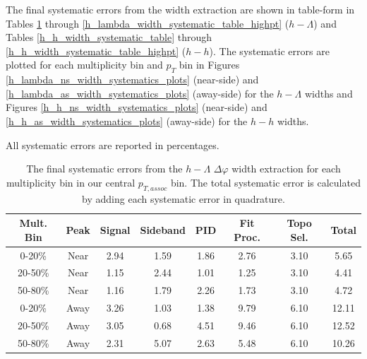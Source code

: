 \documentclass[ALICE,manyauthors]{ALICE_analysis_notes}
\begin{document}
The final systematic errors from the width extraction are shown in table-form in Tables \ref{h_lambda_width_systematic_table} through \ref{h_lambda_width_systematic_table_highpt} ($h-\Lambda$) and Tables \ref{h_h_width_systematic_table} through \ref{h_h_width_systematic_table_highpt} ($h-h$). The systematic errors are plotted for each multiplicity bin and $p_{T}$ bin in Figures \ref{h_lambda_ns_width_systematics_plots} (near-side) and \ref{h_lambda_as_width_systematics_plots} (away-side) for the $h-\Lambda$ widths and Figures \ref{h_h_ns_width_systematics_plots} (near-side) and \ref{h_h_as_width_systematics_plots} (away-side) for the $h-h$ widths.

All systematic errors are reported in percentages. 

\begin{table}[ht]
\centering
\begin{tabular}{|c|c||c|c|c|c|c||c|}
\hline
Mult. Bin & Peak & Signal & Sideband & PID & Fit Proc. & Topo Sel. &  Total \\
\hline

0-20\% & Near & 2.94 & 1.59 & 1.86 & 2.76 & 3.10 & 5.65 \\
20-50\% & Near & 1.15 & 2.44 & 1.01 & 1.25 & 3.10 & 4.41 \\
50-80\% & Near & 1.16 & 1.79 & 2.26 & 1.73 & 3.10 & 4.72 \\
0-20\% & Away & 3.26 & 1.03 & 1.38 & 9.79 & 6.10 & 12.11 \\
20-50\% & Away & 3.05 & 0.68 & 4.51 & 9.46 & 6.10 & 12.52 \\
50-80\% & Away & 2.31 & 5.07 & 2.63 & 5.48 & 6.10 & 10.26 \\

\hline
\end{tabular}
\caption{The final systematic errors from the $h-\Lambda$ $\Delta\varphi$ width extraction  for each multiplicity bin in our central $p_{T, assoc}$ bin. The total systematic error is calculated by adding each systematic error in quadrature.}
\label{h_lambda_width_systematic_table}
\end{table}
\end{document}

